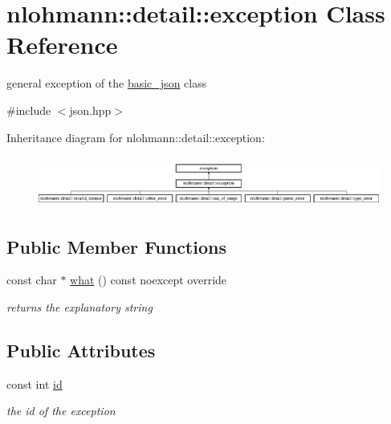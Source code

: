 \hypertarget{classnlohmann_1_1detail_1_1exception}{}\section{nlohmann\+:\+:detail\+:\+:exception Class Reference}
\label{classnlohmann_1_1detail_1_1exception}


general exception of the \hyperlink{classnlohmann_1_1basic__json}{basic\+\_\+json} class  




{\ttfamily \#include $<$json.\+hpp$>$}

Inheritance diagram for nlohmann\+:\+:detail\+:\+:exception\+:\begin{figure}[H]
\begin{center}
\leavevmode
\includegraphics[height=1.680000cm]{classnlohmann_1_1detail_1_1exception}
\end{center}
\end{figure}
\subsection*{Public Member Functions}
\begin{DoxyCompactItemize}
\item 
\mbox{\label{classnlohmann_1_1detail_1_1exception_a0672c25ecdf14d1a071d4d6478a65af0}} 
const char $\ast$ \hyperlink{classnlohmann_1_1detail_1_1exception_a0672c25ecdf14d1a071d4d6478a65af0}{what} () const noexcept override
\begin{DoxyCompactList}\small\item\em returns the explanatory string \end{DoxyCompactList}\end{DoxyCompactItemize}
\subsection*{Public Attributes}
\begin{DoxyCompactItemize}
\item 
\mbox{\label{classnlohmann_1_1detail_1_1exception_a0d4589a3fb54e81646d986c05efa3b9a}} 
const int \hyperlink{classnlohmann_1_1detail_1_1exception_a0d4589a3fb54e81646d986c05efa3b9a}{id}
\begin{DoxyCompactList}\small\item\em the id of the exception \end{DoxyCompactList}\end{DoxyCompactItemize}

